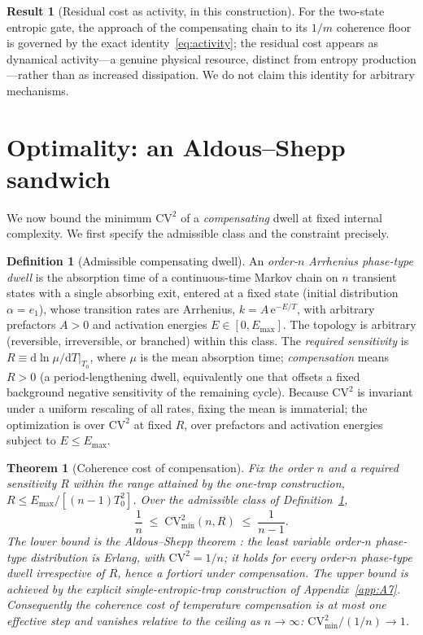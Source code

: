 \documentclass[11pt,onecolumn]{article}
\newtheorem{theorem}{Theorem}
\theoremstyle{definition}
\newtheorem{definition}{Definition}
\newtheorem{result}{Result}
\newcommand{\CV}{\mathrm{CV}}
\newcommand{\Emax}{E_{\max}}
\newcommand{\dd}{\mathrm{d}}
\newcommand{\ee}{\mathrm{e}}
\newcommand{\Tzero}{T_0}
\begin{document}
\begin{result}[Residual cost as activity, in this construction]
\label{res:activity}
For the two-state entropic gate, the approach of the compensating chain to its $1/m$ coherence floor is governed by the exact identity~\eqref{eq:activity}; the residual cost appears as dynamical activity---a genuine physical resource, distinct from entropy production---rather than as increased dissipation. We do not claim this identity for arbitrary mechanisms.
\end{result}

\section{Optimality: an Aldous--Shepp sandwich}
\label{sec:sandwich}

We now bound the minimum $\CV^2$ of a \emph{compensating} dwell at fixed internal complexity. We first specify the admissible class and the constraint precisely.

\begin{definition}[Admissible compensating dwell]
\label{def:class}
An \emph{order-$n$ Arrhenius phase-type dwell} is the absorption time of a continuous-time Markov chain on $n$ transient states with a single absorbing exit, entered at a fixed state (initial distribution $\alpha=e_1$), whose transition rates are Arrhenius, $k=A\,\ee^{-E/T}$, with arbitrary prefactors $A>0$ and activation energies $E\in[0,\Emax]$. The topology is arbitrary (reversible, irreversible, or branched) within this class. The \emph{required sensitivity} is $R\equiv\dd\ln\mu/\dd T\big|_{\Tzero}$, where $\mu$ is the mean absorption time; \emph{compensation} means $R>0$ (a period-lengthening dwell, equivalently one that offsets a fixed background negative sensitivity of the remaining cycle). Because $\CV^2$ is invariant under a uniform rescaling of all rates, fixing the mean is immaterial; the optimization is over $\CV^2$ at fixed $R$, over prefactors and activation energies subject to $E\le\Emax$.
\end{definition}

\begin{theorem}[Coherence cost of compensation]
\label{thm:sandwich}
Fix the order $n$ and a required sensitivity $R$ within the range attained by the one-trap construction, $R \le \Emax/[(n-1)\Tzero^2]$. Over the admissible class of Definition~\ref{def:class},
\begin{equation}
\frac{1}{n} \;\le\; \CV^2_{\min}(n,R) \;\le\; \frac{1}{n-1}.
\end{equation}
The lower bound is the Aldous--Shepp theorem \cite{AldousShepp1987}: the least variable order-$n$ phase-type distribution is Erlang, with $\CV^2=1/n$; it holds for every order-$n$ phase-type dwell irrespective of $R$, hence a fortiori under compensation. The upper bound is achieved by the explicit single-entropic-trap construction of Appendix~\ref{app:A7}. Consequently the coherence cost of temperature compensation is at most one effective step and vanishes relative to the ceiling as $n\to\infty$: $\CV^2_{\min}/(1/n)\to 1$.
\end{theorem}
\end{document}
